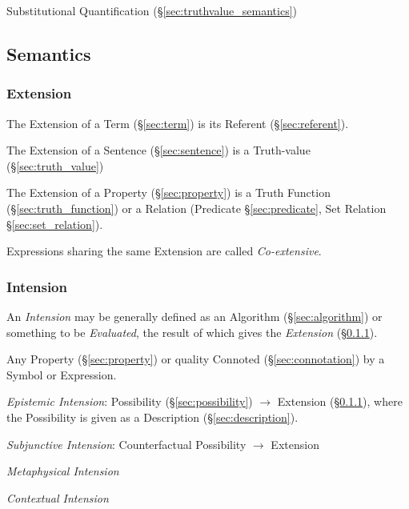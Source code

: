 Substitutional Quantification (\S\ref{sec:truthvalue_semantics})



\subsection{Semantics}\label{sec:semantics}

\subsubsection{Extension}\label{sec:extension}\cite{chalmers02}

The Extension of a Term (\S\ref{sec:term}) is its Referent
(\S\ref{sec:referent}).

The Extension of a Sentence (\S\ref{sec:sentence}) is a Truth-value
(\S\ref{sec:truth_value})

The Extension of a Property (\S\ref{sec:property}) is a Truth Function
(\S\ref{sec:truth_function}) or a Relation (Predicate
\S\ref{sec:predicate}, Set Relation \S\ref{sec:set_relation}).

Expressions sharing the same Extension are called \emph{Co-extensive}.



\subsubsection{Intension}\label{sec:intension}\cite{chalmers02}

An \emph{Intension} may be generally defined as an Algorithm
(\S\ref{sec:algorithm}) or something to be \emph{Evaluated}, the
result of which gives the \emph{Extension} (\S\ref{sec:extension}).

Any Property (\S\ref{sec:property}) or quality Connoted
(\S\ref{sec:connotation}) by a Symbol or Expression.

\emph{Epistemic Intension}: Possibility (\S\ref{sec:possibility})
$\rightarrow$ Extension (\S\ref{sec:extension}), where the Possibility
is given as a Description (\S\ref{sec:description}).

\emph{Subjunctive Intension}: Counterfactual Possibility $\rightarrow$
Extension

\emph{Metaphysical Intension} %

\emph{Contextual Intension}

